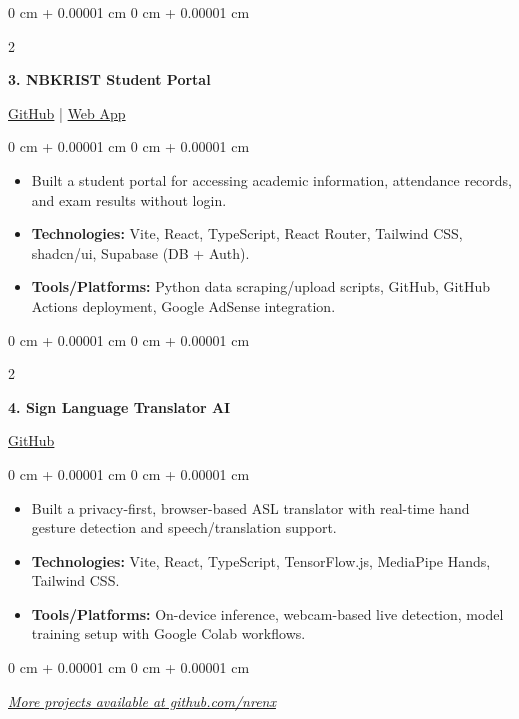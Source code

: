 \documentclass[10pt, a4paper]{article}
\newenvironment{highlights}{
    \begin{itemize}[
        topsep=0.06 cm,
        parsep=0.04 cm,
        partopsep=0pt,
        itemsep=0.02 cm,
        leftmargin=0 cm + 10pt
    ]
}{
    \end{itemize}
}
\newenvironment{onecolentry}{
    \begin{adjustwidth}{
        0 cm + 0.00001 cm
    }{
        0 cm + 0.00001 cm
    }
}{
    \end{adjustwidth}
}
\newenvironment{twocolentry}[2][4.5 cm]{
    \onecolentry
    \def\secondColumn{#2}
    \setcolumnwidth{\fill, #1}
    \begin{paracol}{2}
}{
    \switchcolumn \raggedleft \secondColumn
    \end{paracol}
    \endonecolentry
}
\begin{document}
    \vspace{0.2 cm}

    \begin{twocolentry}{
        \href{https://github.com/nrenx/nbkrist-student-portal}{GitHub} | \href{https://nbkrstudenthub.me/}{Web App}
    }
        \textbf{3. NBKRIST Student Portal}
    \end{twocolentry}
    \begin{onecolentry}
        \begin{highlights}
            \item Built a student portal for accessing academic information, attendance records, and exam results without login.
            \item \textbf{Technologies:} Vite, React, TypeScript, React Router, Tailwind CSS, shadcn/ui, Supabase (DB + Auth).
            \item \textbf{Tools/Platforms:} Python data scraping/upload scripts, GitHub, GitHub Actions deployment, Google AdSense integration.
        \end{highlights}
    \end{onecolentry}

    \vspace{0.2 cm}
    \begin{twocolentry}{
        \href{https://github.com/nrenx/Sign-Language-Translator_using_AI-ML}{GitHub}
    }
        \textbf{4. Sign Language Translator AI}
    \end{twocolentry}
    \begin{onecolentry}
        \begin{highlights}
            \item Built a privacy-first, browser-based ASL translator with real-time hand gesture detection and speech/translation support.
            \item \textbf{Technologies:} Vite, React, TypeScript, TensorFlow.js, MediaPipe Hands, Tailwind CSS.
            \item \textbf{Tools/Platforms:} On-device inference, webcam-based live detection, model training setup with Google Colab workflows.
        \end{highlights}
    \end{onecolentry}

    \vspace{0.2 cm}
    \begin{onecolentry}
        \small{\textit{\href{https://github.com/nrenx}{More projects available at github.com/nrenx}}}
    \end{onecolentry}

    \vspace{0.05 cm}
\end{document}
